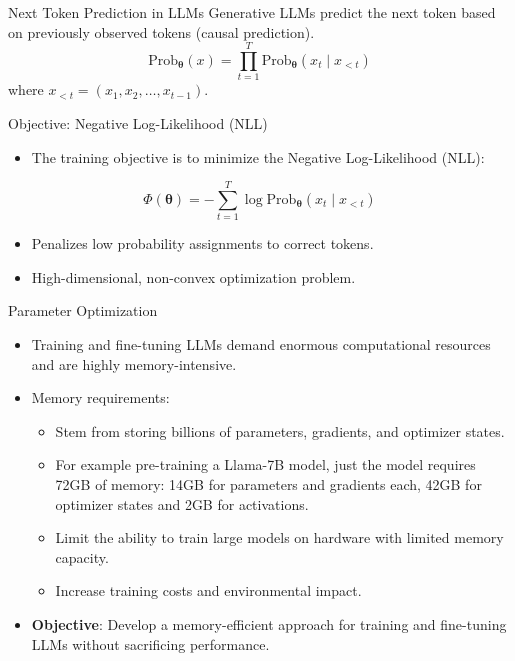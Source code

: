 \documentclass{beamer}
\begin{document}
\begin{frame}{Next Token Prediction in LLMs}
    Generative LLMs predict the next token based on previously observed tokens (causal prediction).
    \begin{equation}
        \text{Prob}_{\mathbf{\theta}}(x) = \prod_{t=1}^{T} \text{Prob}_{\mathbf{\theta}}(x_t \mid x_{<t})
    \end{equation}
    where \( x_{<t} = (x_1, x_2, \dots, x_{t-1}) \).
\end{frame}

\begin{frame}{Objective: Negative Log-Likelihood (NLL)}
    \begin{itemize}
        \item The training objective is to minimize the Negative Log-Likelihood (NLL):
    \end{itemize}
    \begin{equation}
        \Phi(\mathbf{\theta}) = -\sum_{t=1}^{T} \log \text{Prob}_{\mathbf{\theta}}(x_t \mid x_{<t})
        \label{eq:cross_entropy_loss}
    \end{equation}
    \begin{itemize}
        \item Penalizes low probability assignments to correct tokens.
        \item High-dimensional, non-convex optimization problem.
    \end{itemize}
\end{frame}

\begin{frame}{Parameter Optimization}
    \begin{itemize}
        \item Training and fine-tuning LLMs demand enormous computational resources and are highly memory-intensive.
        \item Memory requirements: 
        \begin{itemize}
            \item Stem from storing billions of parameters, gradients, and optimizer states.
            \item For example pre-training a Llama-7B model, just the model requires 72GB of memory: 14GB for parameters and gradients each, 42GB for optimizer states and 2GB for activations. 
            \item Limit the ability to train large models on hardware with limited memory capacity.
            \item Increase training costs and environmental impact.
        \end{itemize}
        \item \textbf{Objective}: Develop a memory-efficient approach for training and fine-tuning LLMs without sacrificing performance.
    \end{itemize}
\end{frame}
\end{document}
